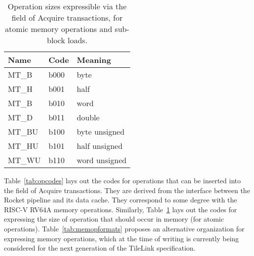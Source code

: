 \begin{table}
\centering
\begin{tabular}{|l|l|l|}
\hline
Name  & Code & Meaning \\ \hline \hline
MT\_B & b000 & byte \\ \hline
MT\_H & b001 & half \\ \hline
MT\_B & b010 & word \\ \hline
MT\_D & b011 & double \\ \hline
MT\_BU & b100 & byte unsigned \\ \hline
MT\_HU & b101 & half unsigned \\ \hline
MT\_WU & b110 & word unsigned \\ \hline
\end{tabular}
\caption[The  field of Acquire transactions.]{
Operation sizes expressible via the  field of Acquire transactions,
for atomic memory operations and sub-block loads.}
\label{tab:opsizes}
\end{table}

Table~\ref{tab:opcodes} lays out the codes for operations
that can be inserted into the  field of Acquire transactions.
They are derived from the interface between the Rocket pipeline and its data cache.
They correspond to some degree with the RISC-V RV64A memory operations.
Similarly, Table~\ref{tab:opsizes} lays out the codes for expressing the size of operation
that should occur in memory (for atomic operations).
Table~\ref{tab:memopformats} proposes an alternative organization for expressing memory operations,
which at the time of writing is currently being considered
for the next generation of the TileLink specification.

